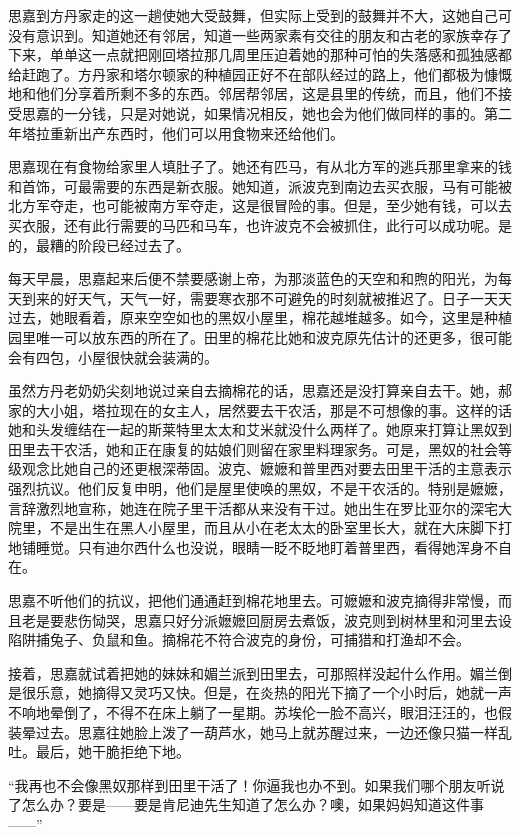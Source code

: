\par 思嘉到方丹家走的这一趟使她大受鼓舞，但实际上受到的鼓舞并不大，这她自己可没有意识到。知道她还有邻居，知道一些两家素有交往的朋友和古老的家族幸存了下来，单单这一点就把刚回塔拉那几周里压迫着她的那种可怕的失落感和孤独感都给赶跑了。方丹家和塔尔顿家的种植园正好不在部队经过的路上，他们都极为慷慨地和他们分享着所剩不多的东西。邻居帮邻居，这是县里的传统，而且，他们不接受思嘉的一分钱，只是对她说，如果情况相反，她也会为他们做同样的事的。第二年塔拉重新出产东西时，他们可以用食物来还给他们。
\par 思嘉现在有食物给家里人填肚子了。她还有匹马，有从北方军的逃兵那里拿来的钱和首饰，可最需要的东西是新衣服。她知道，派波克到南边去买衣服，马有可能被北方军夺走，也可能被南方军夺走，这是很冒险的事。但是，至少她有钱，可以去买衣服，还有此行需要的马匹和马车，也许波克不会被抓住，此行可以成功呢。是的，最糟的阶段已经过去了。
\par 每天早晨，思嘉起来后便不禁要感谢上帝，为那淡蓝色的天空和和煦的阳光，为每天到来的好天气，天气一好，需要寒衣那不可避免的时刻就被推迟了。日子一天天过去，她眼看着，原来空空如也的黑奴小屋里，棉花越堆越多。如今，这里是种植园里唯一可以放东西的所在了。田里的棉花比她和波克原先估计的还更多，很可能会有四包，小屋很快就会装满的。
\par 虽然方丹老奶奶尖刻地说过亲自去摘棉花的话，思嘉还是没打算亲自去干。她，郝家的大小姐，塔拉现在的女主人，居然要去干农活，那是不可想像的事。这样的话她和头发缠结在一起的斯莱特里太太和艾米就没什么两样了。她原来打算让黑奴到田里去干农活，她和正在康复的姑娘们则留在家里料理家务。可是，黑奴的社会等级观念比她自己的还更根深蒂固。波克、嬷嬷和普里西对要去田里干活的主意表示强烈抗议。他们反复申明，他们是屋里使唤的黑奴，不是干农活的。特别是嬷嬷，言辞激烈地宣称，她连在院子里干活都从来没有干过。她出生在罗比亚尔的深宅大院里，不是出生在黑人小屋里，而且从小在老太太的卧室里长大，就在大床脚下打地铺睡觉。只有迪尔西什么也没说，眼睛一眨不眨地盯着普里西，看得她浑身不自在。
\par 思嘉不听他们的抗议，把他们通通赶到棉花地里去。可嬷嬷和波克摘得非常慢，而且老是要悲伤恸哭，思嘉只好分派嬷嬷回厨房去煮饭，波克则到树林里和河里去设陷阱捕兔子、负鼠和鱼。摘棉花不符合波克的身份，可捕猎和打渔却不会。
\par 接着，思嘉就试着把她的妹妹和媚兰派到田里去，可那照样没起什么作用。媚兰倒是很乐意，她摘得又灵巧又快。但是，在炎热的阳光下摘了一个小时后，她就一声不响地晕倒了，不得不在床上躺了一星期。苏埃伦一脸不高兴，眼泪汪汪的，也假装晕过去。思嘉往她脸上泼了一葫芦水，她马上就苏醒过来，一边还像只猫一样乱吐。最后，她干脆拒绝下地。
\par “我再也不会像黑奴那样到田里干活了！你逼我也办不到。如果我们哪个朋友听说了怎么办？要是——要是肯尼迪先生知道了怎么办？噢，如果妈妈知道这件事——”
